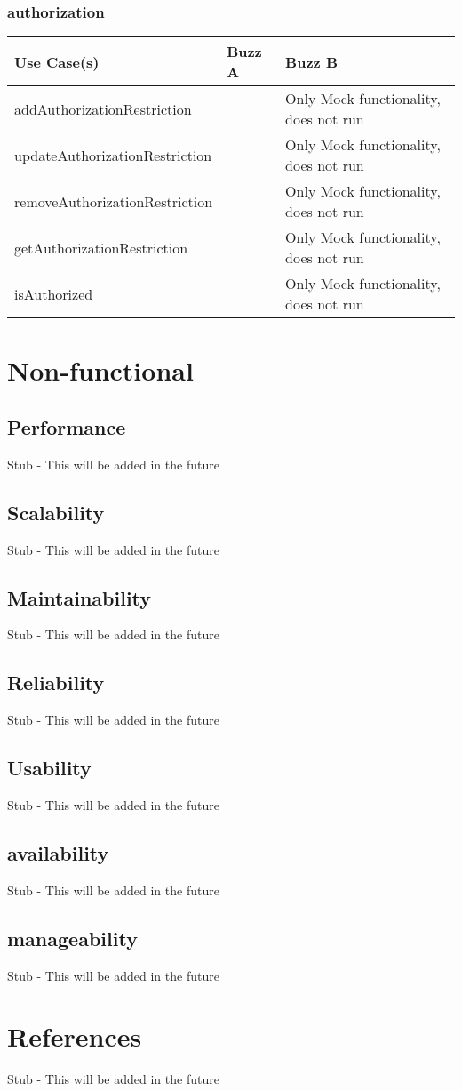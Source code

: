 \documentclass[12pt]{article}
\begin{document}
\subsubsection{authorization}%
\begin{tabular}{|l|l|l|}

\hline
Use Case(s) & Buzz A & Buzz B \\ 
\hline
addAuthorizationRestriction &  & Only Mock functionality, does not run\\ %
\hline
updateAuthorizationRestriction &  & Only Mock functionality, does not run\\ %
\hline
removeAuthorizationRestriction &  & Only Mock functionality, does not run\\ %
\hline
getAuthorizationRestriction &  & Only Mock functionality, does not run\\ %
\hline
isAuthorized &  & Only Mock functionality, does not run\\ %


\end{tabular}
\section{Non-functional} %
\subsection{Performance}
Stub - This will be added in the future
\subsection{Scalability}
Stub - This will be added in the future
\subsection{Maintainability}
Stub - This will be added in the future
\subsection{Reliability}
Stub - This will be added in the future
\subsection{Usability}
Stub - This will be added in the future
\subsection{availability}
Stub - This will be added in the future
\subsection{manageability}
Stub - This will be added in the future

\section{References}
Stub - This will be added in the future
\end{document}
